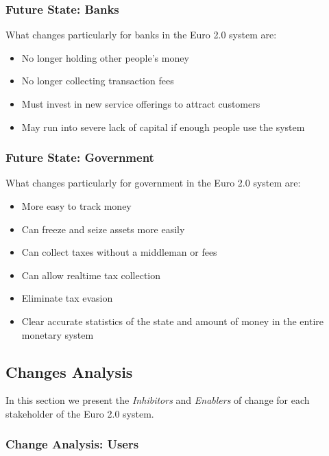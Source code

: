 \documentclass[12pt]{article} %
\begin{document}
{\subsubsection{Future State: Banks} \label{sssec:4.4:banks}

What changes particularly for banks in the Euro 2.0 system are:

\begin{itemize}
	\item No longer holding other people's money
	\item No longer collecting transaction fees
	\item Must invest in new service offerings to attract customers
	\item May run into severe lack of capital if enough people use the system
\end{itemize}

\subsubsection{Future State: Government} \label{sssec:4.4:government}

What changes particularly for government in the Euro 2.0 system are:

\begin{itemize}
	\item More easy to track money
	\item Can freeze and seize assets more easily
	\item Can collect taxes without a middleman or fees
	\item Can allow realtime tax collection
	\item Eliminate tax evasion
	\item Clear accurate statistics of the state and amount of money in the entire monetary system
\end{itemize}

\subsection{Changes Analysis} \label{ssec:4.5}

In this section we present the \textit{Inhibitors} and \textit{Enablers} of change for each stakeholder of the Euro 2.0 system.

\subsubsection{Change Analysis: Users} \label{sssec:4.5:users}

}
\end{document}
